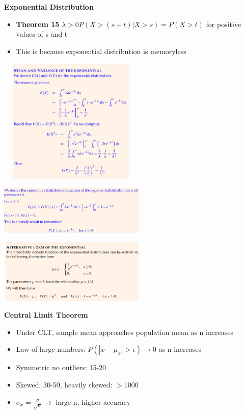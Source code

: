 \documentclass[10pt, landscape]{article}
\begin{document}
\begin{multicols}{4}
\textbf{Exponential Distribution} \newline
\begin{itemize}
  \item \textbf{Theorem 15} $\lambda>0 P(X>(s+t)|X>s)=P(X>t)$ for positive values of s and t
  \item This is because exponential distribution is memoryless 
\end{itemize}
\includegraphics[width=7cm, height=6cm]{exp_mean_Var.png}
\includegraphics[width=7cm, height=3cm]{exp2.png}
\includegraphics[width=7cm, height=3  cm]{exp3.png}

\textbf{Central Limit Theorem} \newline
\begin{itemize}
  \item Under CLT, sample mean approaches population mean as n increases
  \item Law of large numbers: $P(|\bar{x}-\mu_x|>\epsilon) \rightarrow 0$ as n increases
  \item Symmetric no outliers: 15-20
  \item Skewed: 30-50, heavily skewed: $>1000$
  \item $\sigma_{\bar{x}} = \frac{\sigma}{\sqrt{n}} \rightarrow$ large n, higher accuracy 
\end{itemize}



\end{multicols}
\end{document}
